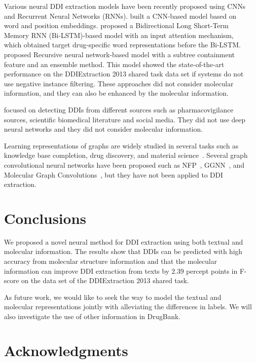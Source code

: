\documentclass[11pt,a4paper]{article}
\begin{document}
Various neural DDI extraction models have been recently proposed using CNNs and Recurrent Neural Networks (RNNs).
 built a CNN-based model based on word and position embeddings. 
 proposed a Bidirectional Long Short-Term Memory RNN (Bi-LSTM)-based model with an input attention mechanism, which obtained  target drug-specific word representations before the Bi-LSTM. 
 proposed Recursive neural network-based model with a subtree containment feature and an ensemble method. This model showed the state-of-the-art performance on the DDIExtraction 2013 shared task data set if systems do not use negative instance filtering. These approaches did not consider molecular information, and they can also be enhanced by the molecular information. 

 focused on detecting DDIs from different sources such as pharmacovigilance sources, scientific biomedical literature and social media. They did not use deep neural networks and they did not consider molecular information.

Learning representations of graphs are widely studied in several tasks such as knowledge base completion, drug discovery, and material science~\cite{wang2017knowledge,gilmer2017neural}. 
Several graph convolutional neural networks have been proposed such as NFP~\cite{NIPS2015_5954}, GGNN~\cite{li2015gated}, and Molecular Graph Convolutions~\cite{kearnes2016molecular}, but they have not been applied to DDI extraction.


\section{Conclusions}

We proposed a novel neural method for DDI extraction using both textual and molecular information.
The results show that DDIs can be predicted with high accuracy from molecular structure information and that the molecular information can improve DDI extraction from texts by 2.39 percept points in F-score on the data set of the DDIExtraction 2013 shared task.

As future work, we would like to seek the way to model the textual and molecular representations jointly with alleviating the differences in labels. We will also investigate the use of other information in DrugBank.


\section*{Acknowledgments}
\end{document}
